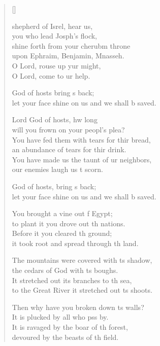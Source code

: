 \settowidth{\versewidth}{let your face shine on us and we shall be saved.}
\begin{verse}[\versewidth]%
  \begin{patverse}
 shepherd of Isrel, hear us,\Med\\
you who lead Josph’s flock,\\
shine forth from your cherub\pointup{\i}m throne\Med\\
upon Ephraim, Benjamin, Mnasseh.\\
O Lord, rouse up yur might,\Med\\
O Lord, come to ur help.

God of hosts bring s back;\Med\\
let your face shine on us and we shall b saved.

Lord God of hosts, hw long\Med\\
will you frown on your peopl’s plea?\\
You have fed them with tears for thir bread,\Med\\
an abundance of tears for thir drink.\\
You have made us the taunt of ur neighbors,\Med\\
our enemies laugh us t scorn.

God of hosts, bring s back;\Med\\
let your face shine on us and we shall b saved.

You brought a vine out f Egypt;\Med\\
to plant it you drove out th nations.\\
Before it you cleared th ground;\Med\\
it took root and spread through th land.

The mountains were covered with \pointup{\i}ts shadow,\Med\\
the cedars of God with \pointup{\i}ts boughs.\\
It stretched out its branches to th sea,\Med\\
to the Great River it stretched out \pointup{\i}ts shoots.

Then why have you broken down \pointup{\i}ts walls?\Med\\
It is plucked by all who pss by.\\
It is ravaged by the boar of th forest,\Med\\
devoured by the beasts of th field.


\end{patverse}
\end{verse}
